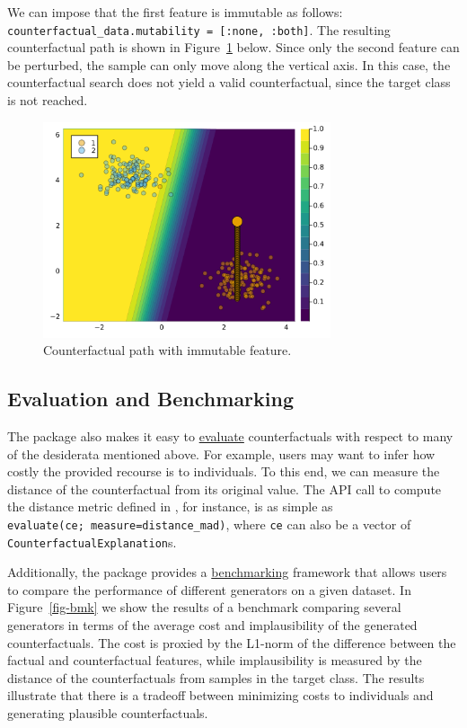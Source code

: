 \documentclass{juliacon}
\begin{document}
We can impose that the first feature is immutable as follows:
\texttt{counterfactual\_data.mutability\ =\ {[}:none,\ :both{]}}. The
resulting counterfactual path is shown in Figure~\ref{fig-mutability}
below. Since only the second feature can be perturbed, the sample can
only move along the vertical axis. In this case, the counterfactual
search does not yield a valid counterfactual, since the target class is
not reached.

\begin{figure}

{\centering \includegraphics[width=3.33333in,height=2.5in]{www/constraint_mutability.png}

}

\caption{\label{fig-mutability}Counterfactual path with immutable
feature.}

\end{figure}

\hypertarget{sec-eval}{%
\subsection{Evaluation and Benchmarking}\label{sec-eval}}

The package also makes it easy to
\href{https://juliatrustworthyai.github.io/CounterfactualExplanations.jl/v0.1/tutorials/evaluation/}{evaluate}
counterfactuals with respect to many of the desiderata mentioned above.
For example, users may want to infer how costly the provided recourse is
to individuals. To this end, we can measure the distance of the
counterfactual from its original value. The API call to compute the
distance metric defined in \textcite{wachter2017counterfactual}, for
instance, is as simple as \texttt{evaluate(ce;\ measure=distance\_mad)},
where \texttt{ce} can also be a vector of
\texttt{CounterfactualExplanation}s.

Additionally, the package provides a
\href{https://juliatrustworthyai.github.io/CounterfactualExplanations.jl/v0.1/tutorials/benchmarking/}{benchmarking}
framework that allows users to compare the performance of different
generators on a given dataset. In Figure~\ref{fig-bmk} we show the
results of a benchmark comparing several generators in terms of the
average cost and implausibility of the generated counterfactuals. The
cost is proxied by the L1-norm of the difference between the factual and
counterfactual features, while implausibility is measured by the
distance of the counterfactuals from samples in the target class. The
results illustrate that there is a tradeoff between minimizing costs to
individuals and generating plausible counterfactuals.
\end{document}
